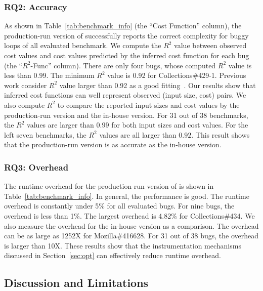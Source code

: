 \subsubsection{RQ2: Accuracy}
As shown in Table~\ref{tab:benchmark_info} (the ``Cost Function'' column),
the production-run version of \Tool successfully 
reports the correct complexity for buggy loops of 
all evaluated benchmark. 
We compute the $R^2$ value between observed cost values and 
cost values predicted by the inferred cost function for each bug 
(the ``$R^2$-Func'' column).  
There are only four bugs, whose computed $R^2$ value is less than $0.99$.
The minimum $R^2$ value is 0.92 for Collections\#429-1. 
Previous work consider $R^2$ value larger than 0.92 
as a good fitting~\cite{rsquare-value}.
Our results show that inferred cost functions can well represent 
observed (input size, cost) pairs. 
We also compute $R^2$ to compare the reported input sizes 
and cost values by the production-run version and the in-house version. 
For 31 out of 38 benchmarks, 
the $R^2$ values are larger than $0.99$ for both input sizes and cost values. 
For the left seven benchmarks, the $R^2$ values are all larger than $0.92$. 
This result shows that the production-run version is 
as accurate as the in-house version. 



\subsubsection{RQ3: Overhead}
The runtime overhead for the production-run version of \Tool is 
shown in Table~\ref{tab:benchmark_info}. 
In general, the performance is good. The runtime overhead is constantly 
under 5\% for all evaluated bugs. 
For nine bugs, the overhead is less than 1\%. 
The largest overhead is 4.82\% for Collections\#434. 
We also measure the overhead for the in-house version as a comparison. 
The overhead can be as large as 1252X for Mozilla\#416628.
For 31 out of 38 bugs, the overhead is larger than 10X. 
These results show that the instrumentation mechanisms 
discussed in Section~\ref{sec:opt} can effectively reduce runtime overhead. 



\subsection{Discussion and Limitations}


